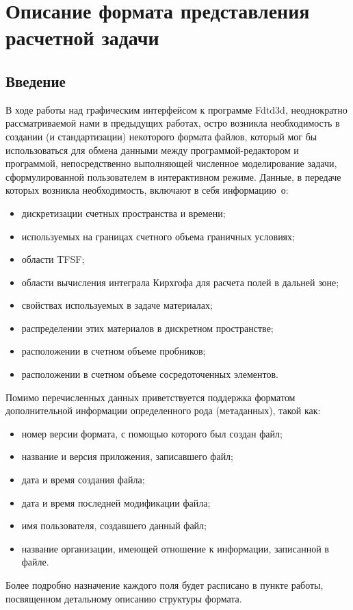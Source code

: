 
\section{Описание формата представления расчетной задачи}

\subsection{Введение}

В ходе работы над графическим интерфейсом к программе Fdtd3d, неоднократно
рассматриваемой нами в предыдущих работах, остро возникла необходимость
в создании (и стандартизации) некоторого формата файлов, который мог бы
использоваться для обмена данными между программой-редактором и программой,
непосредственно выполняющей численное моделирование задачи, сформулированной
пользователем в интерактивном режиме. Данные, в передаче которых возникла
необходимость, включают в себя информацию~о:
\begin{itemize}
\item дискретизации счетных пространства и времени;
\item используемых на границах счетного объема граничных условиях;
\item области TFSF;
\item области вычисления интеграла Кирхгофа для расчета полей в дальней зоне;
\item свойствах используемых в задаче материалах;
\item распределении этих материалов в дискретном пространстве;
\item расположении в счетном объеме пробников;
\item расположении в счетном объеме сосредоточенных элементов.
\end{itemize}

Помимо перечисленных данных приветствуется поддержка форматом дополнительной
информации определенного рода (метаданных), такой как:
\begin{itemize}
\item номер версии формата, с помощью которого был создан файл;
\item название и версия приложения, записавшего файл;
\item дата и время создания файла;
\item дата и время последней модификации файла;
\item имя пользователя, создавшего данный файл;
\item название организации, имеющей отношение к информации, записанной в файле.
\end{itemize}
Более подробно назначение каждого поля будет расписано в пункте работы,
посвященном детальному описанию структуры формата.

